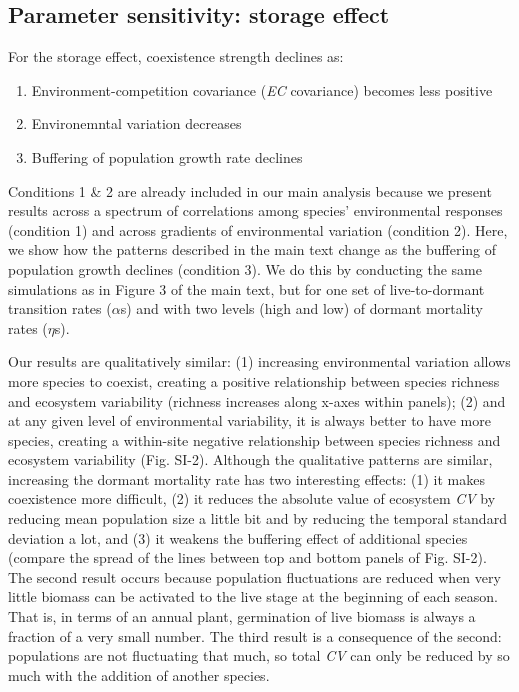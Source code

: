 \documentclass[11pt,]{article}
\providecommand{\tightlist}{%
  \setlength{\itemsep}{0pt}\setlength{\parskip}{0pt}}
\begin{document}
\subsection{Parameter sensitivity: storage effect}

For the storage effect, coexistence strength declines as:

\begin{enumerate}
\def\labelenumi{\arabic{enumi}.}
\tightlist
\item
  Environment-competition covariance (\emph{EC} covariance) becomes less
  positive
\item
  Environemntal variation decreases
\item
  Buffering of population growth rate declines
\end{enumerate}

Conditions 1 \& 2 are already included in our main analysis because we
present results across a spectrum of correlations among species'
environmental responses (condition 1) and across gradients of
environmental variation (condition 2). Here, we show how the patterns
described in the main text change as the buffering of population growth
declines (condition 3). We do this by conducting the same simulations as
in Figure 3 of the main text, but for one set of live-to-dormant
transition rates (\(\alpha\)s) and with two levels (high and low) of
dormant mortality rates (\(\eta\)s).

Our results are qualitatively similar: (1) increasing environmental
variation allows more species to coexist, creating a positive
relationship between species richness and ecosystem variability
(richness increases along x-axes within panels); (2) and at any given
level of environmental variability, it is always better to have more
species, creating a within-site negative relationship between species
richness and ecosystem variability (Fig. SI-2). Although the qualitative
patterns are similar, increasing the dormant mortality rate has two
interesting effects: (1) it makes coexistence more difficult, (2) it
reduces the absolute value of ecosystem \emph{CV} by reducing mean
population size a little bit and by reducing the temporal standard
deviation a lot, and (3) it weakens the buffering effect of additional
species (compare the spread of the lines between top and bottom panels
of Fig. SI-2). The second result occurs because population fluctuations
are reduced when very little biomass can be activated to the live stage
at the beginning of each season. That is, in terms of an annual plant,
germination of live biomass is always a fraction of a very small number.
The third result is a consequence of the second: populations are not
fluctuating that much, so total \emph{CV} can only be reduced by so much
with the addition of another species.
\end{document}
